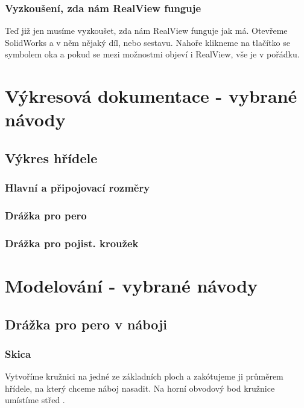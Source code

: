 \subsection*{Vyzkoušení, zda nám RealView funguje}
Teď již jen musíme vyzkoušet, zda nám RealView funguje jak má.
Otevřeme SolidWorks a v něm nějaký díl, nebo sestavu.
Nahoře klikneme na tlačítko se symbolem oka a pokud se mezi možnostmi objeví i RealView, vše je v pořádku. 

\newpage

\chapter{Výkresová dokumentace - vybrané návody}
\fxnote[author=PŠ]{\textcolor{mygreen}{Sekci dopíšu, jakmile začnu točit videa z výkresovky}}

\section{Výkres hřídele}

\subsection{Hlavní a připojovací rozměry}

\subsection{Drážka pro pero}

\subsection{Drážka pro pojist. kroužek}

\newpage

\chapter{Modelování - vybrané návody}

\section{Drážka pro pero v náboji}

\subsection*{Skica}
Vytvoříme kružnici na jedné ze základních ploch a zakótujeme ji průměrem hřídele, na který chceme náboj nasadit.
Na horní obvodový bod kružnice umístíme střed .

